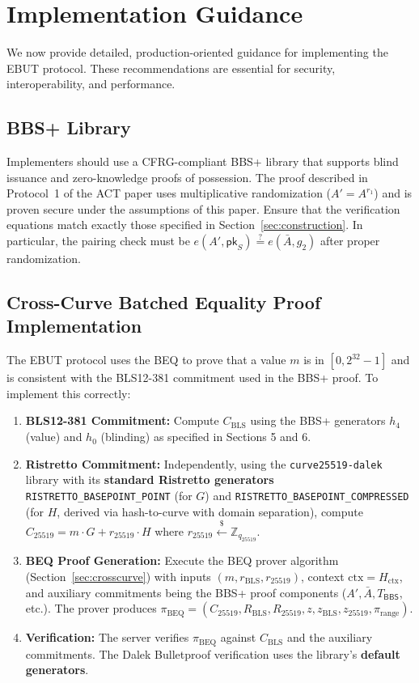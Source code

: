 \documentclass[11pt]{article}
\theoremstyle{definitionstyle}
\theoremstyle{plain}
\begin{document}
\section{Implementation Guidance}
\label{sec:implementation}

We now provide detailed, production-oriented guidance for implementing the EBUT protocol. These recommendations are essential for security, interoperability, and performance.

\subsection{BBS+ Library}

Implementers should use a CFRG-compliant BBS+ library that supports blind issuance and zero-knowledge proofs of possession. The proof described in Protocol~1 of the ACT paper uses multiplicative randomization ($A' = A^{r_1}$) and is proven secure under the assumptions of this paper. Ensure that the verification equations match exactly those specified in Section~\ref{sec:construction}. In particular, the pairing check must be $e(A', \mathsf{pk}_S) \stackrel{?}{=} e(\bar{A}, g_2)$ after proper randomization.

\subsection{Cross-Curve Batched Equality Proof Implementation}

The EBUT protocol uses the BEQ to prove that a value $m$ is in $[0,2^{32}-1]$ and is consistent with the BLS12-381 commitment used in the BBS+ proof. To implement this correctly:

\begin{enumerate}[leftmargin=*]
\item \textbf{BLS12-381 Commitment:} Compute $C_{\text{BLS}}$ using the BBS+ generators $h_4$ (value) and $h_0$ (blinding) as specified in Sections 5 and 6.
\item \textbf{Ristretto Commitment:} Independently, using the \texttt{curve25519-dalek} library with its \textbf{standard Ristretto generators} \texttt{RISTRETTO\_BASEPOINT\_POINT} (for $G$) and \texttt{RISTRETTO\_BASEPOINT\_COMPRESSED} (for $H$, derived via hash-to-curve with domain separation), compute $C_{25519} = m \cdot G + r_{25519} \cdot H$ where $r_{25519} \xleftarrow{\$} \mathbb{Z}_{q_{25519}}$.
\item \textbf{BEQ Proof Generation:} Execute the BEQ prover algorithm (Section~\ref{sec:crosscurve}) with inputs $(m, r_{\text{BLS}}, r_{25519})$, context $\text{ctx} = H_{\text{ctx}}$, and auxiliary commitments being the BBS+ proof components ($A', \bar{A}, T_{\mathsf{BBS}}$, etc.). The prover produces $\pi_{\text{BEQ}} = (C_{25519}, R_{\text{BLS}}, R_{25519}, z, z_{\text{BLS}}, z_{25519}, \pi_{\text{range}})$.
\item \textbf{Verification:} The server verifies $\pi_{\text{BEQ}}$ against $C_{\text{BLS}}$ and the auxiliary commitments. The Dalek Bulletproof verification uses the library's \textbf{default generators}.
\end{enumerate}
\end{document}

